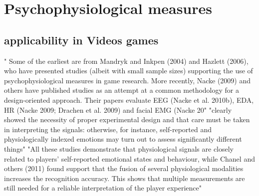\section{Psychophysiological measures}

\subsection{applicability in Videos games}
" Some of the earliest are from Mandryk and Inkpen (2004) and Hazlett (2006), who have presented studies (albeit with small sample sizes) supporting the use of psychophysiological measures in game research. More recently, Nacke (2009) and others have published studies as an attempt at a common methodology for a design-oriented approach. Their papers evaluate EEG (Nacke et al. 2010b), EDA, HR (Nacke 2009; Drachen et al. 2009) and facial EMG (Nacke 20" \cite{kivikangas2011review} "clearly showed the necessity of proper experimental design and that care must be taken in interpreting the signals: otherwise, for instance, self-reported and physiologically indexed emotions may turn out to assess significantly different things"  \cite{kivikangas2011review}
"All these studies demonstrate that physiological signals are closely related to players’ self-reported emotional states and behaviour, while Chanel and others (2011) found support that the fusion of several physiological modalities increases the recognition accuracy. This shows that multiple measurements are still needed for a reliable interpretation of the player experience"  \cite{kivikangas2011review}








